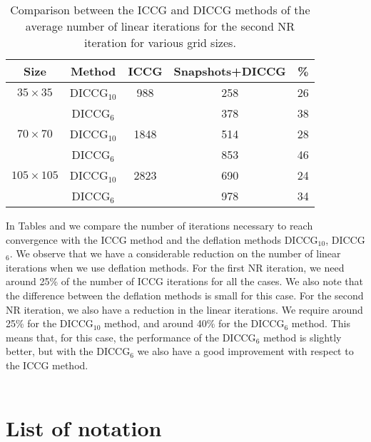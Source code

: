 \documentclass[12pt]{article}
\numberwithin{equation}{section}
\begin{document}
\begin{table}[!ht]
\begin{minipage}{1\textwidth}
\vspace{-10pt}
\centering
\begin{tabular}{ |c|c|c|c|c|} 

\hline
Size&Method& ICCG & Snapshots+DICCG &\% \\
\hline
$35\times35$ &DICCG$_{10}$&988 &258  &26 \\
&DICCG$_6$& & 378 & 38\\
\hline
$70\times70$ &DICCG$_{10}$& 1848& 514 &28 \\
 &DICCG$_6$& &853  &46 \\
\hline
$105\times105$ &DICCG$_{10}$& 2823&690  &24 \\
 &DICCG$_6$& & 978 &34 \\
 \hline
 \end{tabular}
\caption{Comparison between the ICCG and DICCG methods of the average number of linear iterations for the second NR iteration for various grid sizes. }\label{table:litertots2}
\end{minipage}
\end{table}


In Tables \label{table:litertots1} and \label{table:litertots2} we compare the number of iterations necessary to reach convergence with the ICCG method and the deflation methods DICCG$_{10}$, DICCG$_6$. We observe that we have a considerable reduction on the number of linear iterations when we use deflation methods. For the first NR iteration, we need around 25\% of the number of ICCG iterations for all the cases. We also note that the difference between the deflation methods is small for this case. For the second NR iteration, we also have a reduction in the linear iterations. We require around 25\% for the DICCG$_{10}$ method, and around 40\% for the DICCG$_6$ method. This means that, for this case, the performance of the DICCG$_6$ method is slightly better, but with the DICCG$_6$ we also have a good improvement with respect to the ICCG method.   \\ \\

\newpage

 
 \newpage
 
% 
\newpage
\newpage
\appendix
\section{List of notation}\label{a1}
\end{document}
